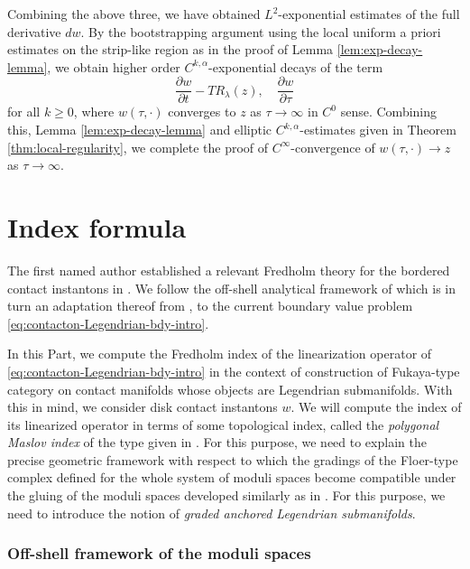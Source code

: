 \documentclass[reqno]{amsart}
\newcommand{\del}{\partial}
\theoremstyle{theorem}
\theoremstyle{definition}
\numberwithin{equation}{section}
\begin{document}
Combining the above three, we have obtained $L^2$-exponential estimates of the full derivative $dw$.
By the bootstrapping argument using the local uniform a priori estimates
on the strip-like region as in the proof of Lemma \ref{lem:exp-decay-lemma},
we obtain higher order $C^{k,\alpha}$-exponential decays of the term
$$
\frac{\del w}{\del t} - T R_\lambda(z), \quad \frac{\del w}{\del\tau}
$$
for all $k\geq 0$, where $w(\tau,\cdot)$ converges to $z$ as $\tau \to \infty$ in $C^0$ sense.
Combining this, Lemma \ref{lem:exp-decay-lemma} and elliptic $C^{k,\alpha}$-estimates
given in Theorem \ref{thm:local-regularity}, we complete the proof of $C^\infty$-convergence of
$w(\tau,\cdot) \to z$ as $\tau \to \infty$.

\part{Index formula}
\label{part:index}

The first named author established a
relevant  Fredholm theory for the bordered contact instantons in \cite{oh:contacton-transversality}.
 We  follow the off-shell analytical framework of \cite{oh:contacton-transversality} which is in turn an
 adaptation thereof from  \cite{oh:contacton}, \cite{oh-savelyev}  to the current
 boundary value problem \eqref{eq:contacton-Legendrian-bdy-intro}.

 In this Part, we compute the Fredholm index of the linearization operator of
 \eqref{eq:contacton-Legendrian-bdy-intro} in the context of construction of Fukaya-type category
 on contact manifolds whose objects are Legendrian submanifolds. With this in mind, we
 consider disk contact instantons $w$. We will compute the index of its linearized operator
 in terms of some topological index, called the
 \emph{polygonal Maslov index} of the type given in \cite{fooo:anchored}. For this purpose,
 we need to explain the precise geometric framework with respect to which
 the gradings of the Floer-type complex defined for the whole system of
 moduli spaces become compatible under the gluing of the moduli spaces
 developed similarly as in \cite{oh:contacton-gluing}. For this purpose, we need to
 introduce the notion of \emph{graded anchored Legendrian submanifolds}.

\section{Off-shell framework of the moduli spaces}
\label{sec:off-shell}
\end{document}
